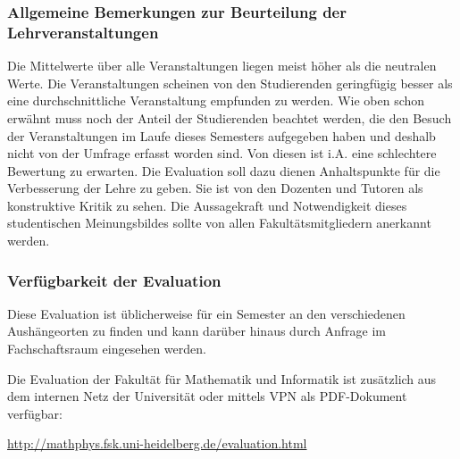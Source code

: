 \subsubsection{Allgemeine Bemerkungen zur Beurteilung der Lehrveranstaltungen}
Die Mittelwerte über alle Veranstaltungen liegen meist höher als
die neutralen Werte. Die Veranstaltungen scheinen von den Studierenden
geringfügig besser als eine durchschnittliche Veranstaltung empfunden zu werden.
Wie oben schon erwähnt muss noch der Anteil der Studierenden
beachtet werden, die den 
Besuch der Veranstaltungen im Laufe dieses Semesters aufgegeben haben und 
deshalb nicht von der Umfrage erfasst worden sind. Von 
diesen ist i.A. eine schlechtere Bewertung zu erwarten. 
Die Evaluation soll dazu dienen Anhaltspunkte für die Verbesserung der Lehre zu geben. Sie ist von den Dozenten und Tutoren als konstruktive Kritik zu sehen. Die Aussagekraft und Notwendigkeit dieses studentischen Meinungsbildes sollte von allen Fakultätsmitgliedern anerkannt werden.

\subsubsection{Verfügbarkeit der Evaluation}
Diese Evaluation ist üblicherweise für ein Semester an den verschiedenen Aushängeorten zu finden und kann darüber hinaus durch Anfrage im Fachschaftsraum eingesehen werden.

Die Evaluation der Fakultät für Mathematik und Informatik ist zusätzlich aus dem internen Netz der Universität oder mittels VPN als PDF-Dokument verfügbar:

\url{http://mathphys.fsk.uni-heidelberg.de/evaluation.html}
